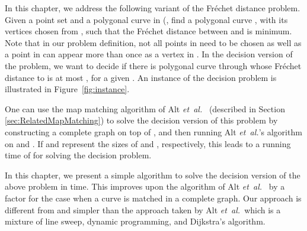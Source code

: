 \documentclass[12pt]{dalthesis}
\newcommand{\etal}{{\em et~al.\/}}
\newcommand{\REM}[1]{}
\newcommand{\Frechet}{Fr\'echet }
\begin{document}
\REM{
Matching two geometric patterns is a fundamental problem in pattern recognition,
protein structure prediction, computer vision, geographic information systems, etc.
Usually these patterns consist of line segments and polygonal curves. 

One of the most popular ways to measure the similarity of two curves is
to use the \Frechet distance. 
An intuitive way to illustrate the \Frechet distance is as follows.
Imagine a person walking his/her dog, where the person and the dog, 
each travels a pre-specified curve, from beginning to the end, 
without ever letting go of the leash or backtracking.
The \Frechet distance between the two curves is the minimum length of a leash which is necessary.
The leash length determines how similar the two curves are to each other:
a short leash means the curves are similar,
and a long leash means that the curves are different from each other.

Two problem instances naturally arise:  decision and optimization.
In the {\em decision problem}, one wants to decide whether two polygonal curves   and 
are within~ \Frechet distance to each other. In the {\em optimization problem}, one wishes to determine the minimum such~.
Alt and Godau~\cite{AltG95} presented an -time algorithm for the decision problem,
where  denotes the total number of segments in the curves.
They also solved the corresponding optimization problem in  time.
}
In this chapter, we address the following variant of the \Frechet distance problem.
Given a point set  and a polygonal curve  in  (,
find a polygonal curve , with its vertices chosen from , 
such that the \Frechet distance between  and  is minimum.
Note that in our problem definition, 
not all points in  need to be chosen as well as 
a point in  can appear more than 
once as a vertex  in . 
In the decision version of the problem,
we want to decide if there is polygonal curve  through 
whose \Frechet distance to  is at most , for a given .
An instance of the decision problem is illustrated in Figure~\ref{fig:instance}.

One can use the map matching algorithm of Alt \etal~\cite{AltERW03a} (described in 
Section \ref{sec:RelatedMapMatching})
to solve the decision version of this problem 
by constructing a complete graph  on top of ,
and then running Alt \etal's algorithm on  and .
If  and  represent the sizes of  and , respectively,
this leads to a running time of  
for solving the decision problem.

In this chapter, we present a simple algorithm to solve the decision version 
of the above problem in  time.
This improves upon the algorithm of Alt \etal~\cite{AltERW03a}
by a  factor for the case when a curve is matched in a complete graph.
Our approach is different from and simpler
than the approach taken by Alt \etal\ which is a mixture of line sweep, dynamic
programming, and Dijkstra's algorithm.
\end{document}
